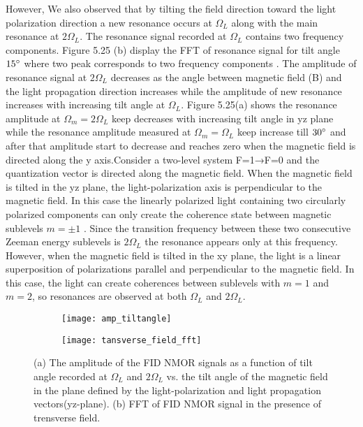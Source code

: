 \documentclass[12pt]{report}
\begin{document}
However, We also observed that by tilting the field direction toward the light polarization direction a new resonance occurs at $\Omega_L$ along with the main resonance at $2\Omega_L$. The resonance signal recorded at $\Omega_L$ contains two frequency components. Figure 5.25 (b) display the FFT of resonance signal for tilt angle $15\degree$ where two peak corresponds to two frequency components . The amplitude of  resonance signal at $2\Omega_L$  decreases as the angle between magnetic field (B) and the light propagation direction increases while the amplitude of new resonance  increases with increasing tilt angle at $\Omega_L$. Figure 5.25(a) shows the resonance amplitude at $\Omega_m=2\Omega_L$ keep decreases with increasing tilt angle in yz plane while  the resonance amplitude measured at $\Omega_m=\Omega_L$ keep increase till $30\degree$ and after that amplitude start to decrease and reaches zero when the magnetic field is directed along the y axis.Consider a two-level system F=1→F=0 and the quantization vector is directed along the magnetic field. When the magnetic field is tilted in the yz plane, the light-polarization axis is perpendicular to the magnetic field. In this case the linearly polarized light containing two circularly polarized components can only create the coherence state between magnetic sublevels $m = ±1$ . Since the transition frequency between these two consecutive Zeeman energy sublevels is $2\Omega_L$  the resonance appears only at this frequency. However, when the magnetic field is tilted  in the xy plane, the light is a linear superposition of polarizations parallel and perpendicular to the magnetic field. In this case, the light can create coherences between sublevels with $m=1$ and $m=2$, so resonances are observed at both $\Omega_L $ and $2\Omega_L$.

\begin{figure}
    \centering
   \begin{subfigure}[b]{0.45\textwidth}
        \centering
        \texttt{[image: amp\_tiltangle]}
        \caption{}
        \label{fig:y equals x}
    \end{subfigure}
    \hfill
     \begin{subfigure}[b]{0.45\textwidth}
        \centering
        \texttt{[image: tansverse\_field\_fft]}
        \caption{}
        \label{fig:three sin x}
    \end{subfigure}
    \caption{(a) The amplitude of the FID NMOR signals as a function of tilt angle recorded at $\Omega_L$ and $2\Omega_L$ vs. the tilt angle of the magnetic field in the plane defined by the light-polarization and light propagation vectors(yz-plane). (b) FFT of FID NMOR signal in the presence of trensverse field.}
\end{figure}
\end{document}
